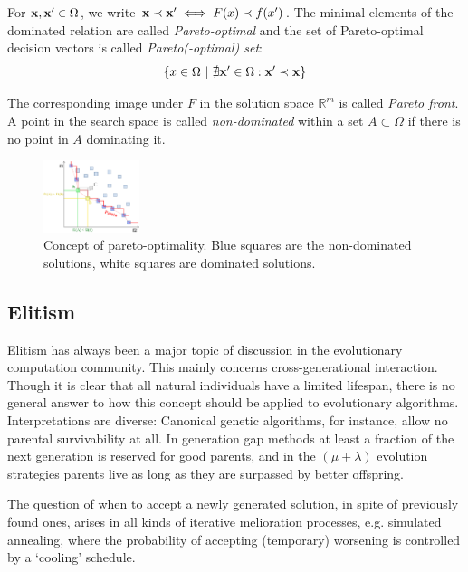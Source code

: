 \documentclass[%
 reprint,
 amsmath,amssymb,
 aps,
]{revtex4-2}
\newcommand{\bb}[1]
{\mathbb{#1}}
\begin{document}
For $\bold{x}, \bold{x}' \in \Omega$, we write $\bold{x} \prec \bold{x}' \iff F(x) \prec f(x')$. The minimal elements of the dominated relation are called \textit{Pareto-optimal} and the set of Pareto-optimal decision vectors is called \textit{Pareto(-optimal) set}: 
\begin{equation}
\{x \in \Omega\ | \ \nexists \bold{x}' \in \Omega: \bold{x}' \prec \bold{x}\}
\end{equation}

The corresponding image under $F$ in the solution space $\bb{R}^m$ is called \textit{Pareto front}. A point in the search space is called \textit{non-dominated} within a set $A \subset \Omega$ if there is no point in $A$ dominating it.


\begin{figure}[b]
\includegraphics[width=0.25\textwidth]{fig_0}%
\caption{\label{fig:pareto-optimality} Concept of pareto-optimality. Blue squares are the non-dominated solutions, white squares are dominated solutions.}
\end{figure}


\subsection{\label{sec:level2}Elitism}

\cite{A unified model Laumanns}
Elitism has always been a major topic of discussion in the evolutionary computation community. This mainly concerns
cross-generational interaction. Though it is clear that all natural
individuals have a limited lifespan, there is no general
answer to how this concept should be applied to evolutionary
algorithms. Interpretations are diverse: Canonical genetic algorithms,
for instance, allow no parental survivability at all.
In generation gap methods at least a fraction of the next generation
is reserved for good parents, and in the $(\mu + \lambda)$ evolution strategies parents live as long as they are surpassed by better offspring.

The question of when to accept a newly generated solution,
in spite of previously found ones, arises in all kinds
of iterative melioration processes, e.g. simulated annealing,
where the probability of accepting (temporary) worsening is
controlled by a `cooling' schedule.
\end{document}
